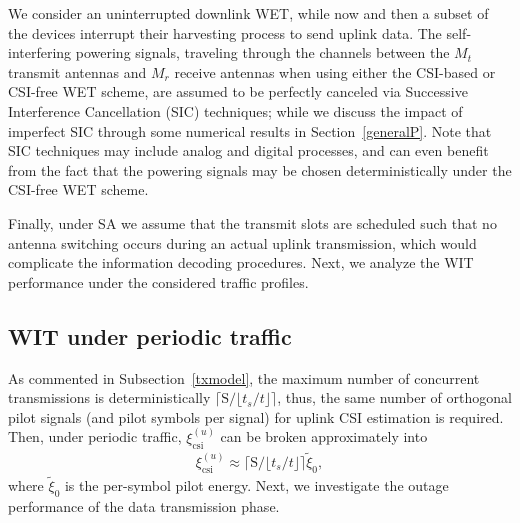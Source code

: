 \documentclass[10pt,journal,a4paper]{IEEEtran}
\begin{document}
	We consider an uninterrupted downlink WET, while now and then a subset of the devices interrupt their harvesting process  to send uplink data. The self-interfering powering signals, traveling through the channels between the $M_t$ transmit antennas and $M_r$ receive antennas when using either the CSI-based or CSI-free WET scheme, are assumed to be perfectly canceled  via Successive Interference Cancellation (SIC) techniques; while we discuss the impact of imperfect SIC through some numerical results in Section~\ref{generalP}. Note that SIC techniques may include analog and digital processes, and can even benefit from the fact that the powering signals may be chosen deterministically under the CSI-free WET scheme.
	
	Finally, under SA we assume that the transmit slots are scheduled such that no antenna switching occurs during an actual uplink transmission, which would complicate the information decoding procedures. Next, we analyze the WIT performance under the considered traffic profiles.
	\subsection{WIT under periodic traffic}\label{periodic}
	As commented in Subsection~\ref{txmodel}, the maximum number of concurrent transmissions is deterministically $\lceil\mathrm{S}/\lfloor t_s/t\rfloor\rceil$, thus, the same number of orthogonal pilot signals (and pilot symbols per signal) for uplink CSI estimation is required. Then, under periodic traffic, $\xi_\mathrm{csi}^{(u)}$ can be broken approximately into
	\begin{align}
	\xi_\mathrm{csi}^{(u)}\approx\lceil\mathrm{S}/\lfloor t_s/t\rfloor\rceil \tilde{\xi}_0,
	\end{align}
	where $\tilde{\xi}_0$ is the per-symbol pilot energy. Next, we investigate the outage performance of the data transmission phase.
\end{document}
